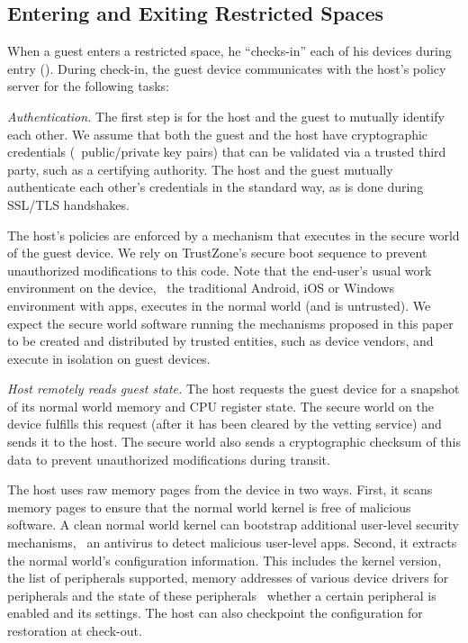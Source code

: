 \subsection{Entering and Exiting Restricted Spaces}
\label{section:usagemodel:checkin}

 When a guest enters a restricted space, he ``checks-in''
each of his devices during entry ().  During
check-in, the guest device communicates with the host's policy server for the
following tasks:

\begin{mylist}
%
\item \textit{Authentication.} The first step is for the host and the guest to
mutually identify each other. We assume that both the guest and the host have
cryptographic credentials (\eg~public/private key pairs) that can be validated
via a trusted third party, such as a certifying authority. The host and the
guest mutually authenticate each other's credentials in the standard way, as is
done during SSL/TLS handshakes.

The host's policies are enforced by a mechanism that executes in the secure
world of the guest device. We rely on TrustZone's secure boot sequence to
prevent unauthorized modifications to this code. Note that the end-user's usual
work environment on the device, \eg~the traditional Android, iOS or Windows
environment with apps, executes in the normal world (and is untrusted). We
expect the secure world software running the mechanisms proposed in this paper
to be created and distributed by trusted entities, such as device vendors, and
execute in isolation on guest devices.

\item \textit{Host remotely reads guest state.} The host requests the guest
device for a snapshot of its normal world memory and CPU register state. The
secure world on the device fulfills this request (after it has been cleared by
the vetting service) and sends it to the host. The secure world also sends a
cryptographic checksum of this data to prevent unauthorized modifications
during transit.

The host uses raw memory pages from the device in two ways. First, it scans
memory pages to ensure that the normal world kernel is free of malicious
software. A clean normal world kernel can bootstrap additional user-level
security mechanisms, \eg~an antivirus to detect malicious user-level apps.
Second, it extracts the normal world's configuration information. This includes
the kernel version, the list of peripherals supported, memory addresses of
various device drivers for peripherals and the state of these peripherals
\eg~whether a certain peripheral is enabled and its settings. The host can also
checkpoint the configuration for restoration at check-out. 


\end{mylist}
